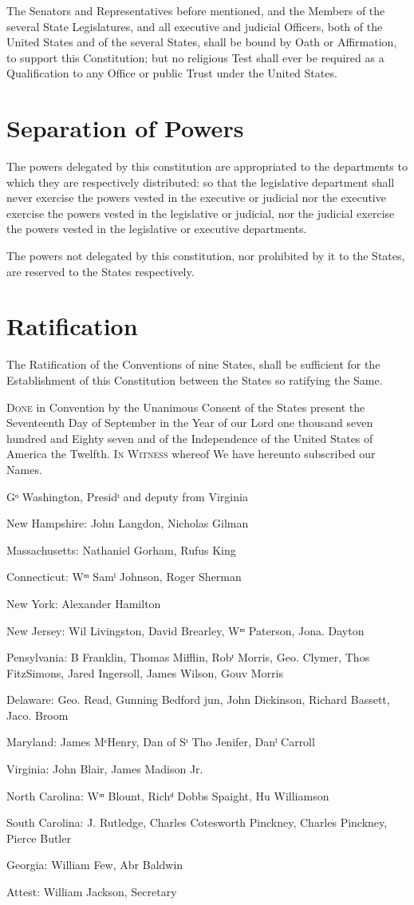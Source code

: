 \documentclass{constitution}
\begin{document}
The Senators and Representatives before mentioned,
and the Members of the several State Legislatures,
and all executive and judicial Officers, both of the United States and of the several States,
shall be bound by Oath or Affirmation, to support this Constitution;
but no religious Test shall ever be required as a Qualification to any Office or public Trust under the United States.

\chapter{Separation of Powers}
The powers delegated by this constitution
are appropriated to the departments
to which they are respectively distributed:
so that the legislative department shall never exercise the powers
	vested in the executive or judicial
nor the executive exercise the powers
	vested in the legislative or judicial,
nor the judicial exercise the powers
	vested in the legislative or executive departments.

The powers not delegated by this constitution,
nor prohibited by it to the States,
are reserved to the States respectively.

\chapter{Ratification}
The Ratification of the Conventions of nine States,
shall be sufficient for the Establishment of this Constitution
between the States so ratifying the Same.

\textsc{Done} in Convention by the Unanimous Consent of the States present
the Seventeenth Day of September
in the Year of our Lord one thousand seven hundred and Eighty seven
and of the Independence of the United States of America the Twelfth.
\textsc{In Witness} whereof We have hereunto subscribed our Names.

Gᵒ Washington, Presidᵗ and deputy from Virginia

New Hampshire:		John Langdon, Nicholas Gilman

Massachusetts:		Nathaniel Gorham, Rufus King

Connecticut:		Wᵐ Samˡ Johnson, Roger Sherman

New York:		Alexander Hamilton

New Jersey:		Wil Livingston, David Brearley, Wᵐ Paterson, Jona. Dayton

Pensylvania:		B Franklin, Thomas Mifflin, Robᵗ Morris, Geo. Clymer, Thos FitzSimons,
			Jared Ingersoll, James Wilson, Gouv Morris

Delaware:		Geo. Read, Gunning Bedford jun, John Dickinson, Richard Bassett, Jaco. Broom

Maryland:		James MᶜHenry, Dan of Sᵗ Tho Jenifer, Danˡ Carroll

Virginia:		John Blair, James Madison Jr.

North Carolina:	Wᵐ Blount, Richᵈ Dobbs Spaight, Hu Williamson

South Carolina:	J. Rutledge, Charles Cotesworth Pinckney, Charles Pinckney, Pierce Butler

Georgia:		William Few, Abr Baldwin

Attest: William Jackson, Secretary
\end{document}
